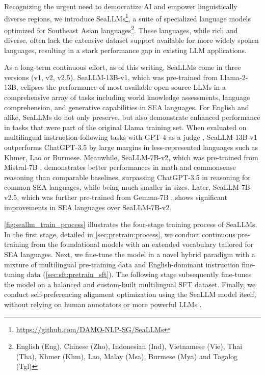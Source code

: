 Recognizing the urgent need to democratize AI and empower linguistically diverse regions, we introduce SeaLLMs\footnote{\href{https://github.com/DAMO-NLP-SG/SeaLLMs}{https://github.com/DAMO-NLP-SG/SeaLLMs}}, a suite of specialized language models optimized for Southeast Asian languages\footnote{English (Eng), Chinese (Zho), Indonesian (Ind), Vietnamese (Vie), Thai (Tha), Khmer (Khm), Lao, Malay (Msa), Burmese (Mya) and Tagalog (Tgl)}. These languages, while rich and diverse, often lack the extensive dataset support available for more widely spoken languages, resulting in a stark performance gap in existing LLM applications. 

As a long-term continuous effort, as of this writing, SeaLLMs come in three versions (v1, v2, v2.5). SeaLLM-13B-v1, which was pre-trained from Llama-2-13B, eclipses the performance of most available open-source LLMs in a comprehensive array of tasks including world knowledge assessments, language comprehension, and generative capabilities in SEA languages. For English and alike, SeaLLMs do not only preserve, but also demonstrate enhanced performance in tasks that were part of the original Llama training set. When evaluated on multilingual instruction-following tasks with GPT-4 as a judge \citep{mt_bench_zheng2023judging}, SeaLLM-13B-v1 outperforms ChatGPT-3.5 by large margins in less-represented languages such as Khmer, Lao or Burmese. Meanwhile, SeaLLM-7B-v2, which was pre-trained from Mistral-7B \citep{mistral7b_jiang2023mistral}, demonstrates better performances in math and commonsense reasoning than comparable baselines, surpassing ChatGPT-3.5 in reasoning for common SEA languages, while being much smaller in sizes. Later, SeaLLM-7B-v2.5, which was further pre-trained from Gemma-7B \citep{gemma_team2024}, shows significant improvements in SEA languages over SeaLLM-7B-v2.

\ref{fig:seallm_train_process} illustrates the four-stage training process of SeaLLMs. In the first stage, detailed in \ref{sec:pretrain:process}, we conduct continuous pre-training from the foundational models \citep{llama2touvron2023llama,mistral7b_jiang2023mistral} with an extended vocabulary tailored for SEA languages. Next, we fine-tune the model in a novel hybrid paradigm with a mixture of multilingual pre-training data and English-dominant instruction fine-tuning data (\ref{sec:sft:pretrain_sft}). The following stage subsequently fine-tunes the model on a balanced and custom-built multilingual SFT dataset. Finally, we conduct self-preferencing alignment optimization using the SeaLLM model itself, without relying on human annotators or more powerful LLMs \citep{gpt4}.

